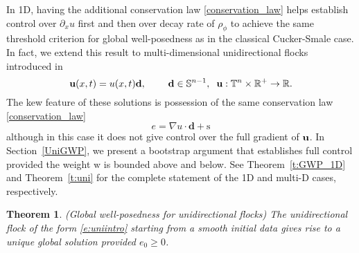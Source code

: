 \documentclass[11pt,letterpaper]{amsart}
\theoremstyle{plain}
\newtheorem{theorem}[THEOREM]{Theorem}
\theoremstyle{definition}
\theoremstyle{remark}
\newcommand{\thm}[1]{Theorem~\ref{#1}}
\newcommand{\sect}[1]{Section~\ref{#1}}
\newcommand{\R}{\ensuremath{\mathbb{R}}}   %
\newcommand{\T}{\ensuremath{\mathbb{T}}}   %
\def \n {\nabla}
\def \bd {{\bf d}}
\def \bu {{\bf u}}
\renewcommand{\geq}{\geqslant}
\def\R{\mathbb{R}}
\def\T{\mathbb{T}}
\def\u{\textbf{u}}
\def\bd{\textbf{d}}
\def \st {\mathrm{s}}
\def \wt {\mathrm{w}}
\begin{document}
In 1D, having the additional conservation law \eqref{conservation_law} helps establish control over $\partial_x u$ first and then over decay rate of $\rho_\phi$ to achieve the same threshold criterion for global well-posedness as in the classical Cucker-Smale case. 
In fact, we extend this result to multi-dimensional unidirectional flocks introduced in \cite{LS-uni1}
\begin{equation}\label{e:uniintro} 
    \u(x,t) = u(x,t) \bd, \hspace{8mm} \bd \in \mathbb{S}^{n-1}, \hspace{2mm} \u: \T^n \times \R^+ \to \R.
\end{equation}
The kew feature of these solutions is possession of the same conservation law \eqref{conservation_law} 
\[
e = \n u \cdot \bd + \st
\]
although in this case it does not give control over the full gradient of $\bu$. In \sect{UniGWP}, we present a bootstrap argument that establishes full control provided the weight $\wt$ is bounded above and below. 
See \thm{t:GWP_1D} and \thm{t:uni} for the complete statement of the 1D and multi-D cases, respectively.
\begin{theorem}\label{thm:UniGWP} (Global well-posedness for unidirectional flocks)
The unidirectional flock of the form \eqref{e:uniintro} starting from a smooth initial data gives rise to a unique global solution provided $e_0 \geq 0$.
\end{theorem}
\end{document}
